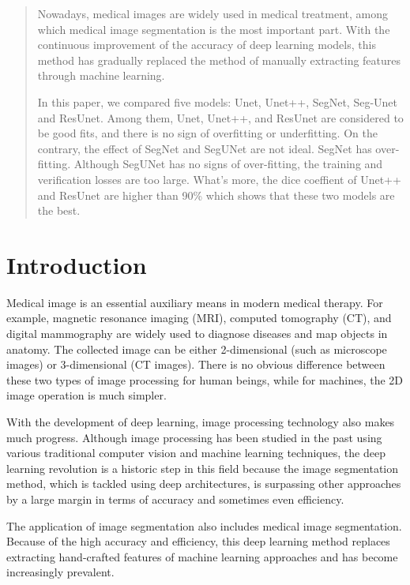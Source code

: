 \documentclass{article}
\begin{document}
\setlength{\parindent}{2em}



\begin{abstract}
    Nowadays, medical images are widely used in medical treatment, among which medical image segmentation is the most important part. With the continuous improvement of the accuracy of deep learning models, this method has gradually replaced the method of manually extracting features through machine learning.

    In this paper,  we compared five models: Unet, Unet++, SegNet, Seg-Unet and ResUnet.
    Among them, Unet, Unet++, and ResUnet are considered to be good fits, and there is no sign of overfitting or underfitting.
    On the contrary, the effect of SegNet and SegUNet are not ideal. SegNet has over-fitting. Although SegUNet has no signs of over-fitting, the training and verification losses are too large.
    What’s more, the dice coeffient of Unet++ and ResUnet are higher than 90\% which shows that these two models are the best.

\end{abstract}

\section{Introduction}

Medical image is an essential auxiliary means in modern medical therapy.
For example, magnetic resonance imaging (MRI), computed tomography (CT), and digital mammography are widely used to diagnose diseases and map objects in anatomy.\cite{pham2000current}
The collected image can be either 2-dimensional (such as microscope images) or 3-dimensional (CT images).
There is no obvious difference between these two types of image processing for human beings, while for machines, the 2D image operation is much simpler.

With the development of deep learning, image processing technology also makes much progress.
Although image processing has been studied in the past using various traditional computer vision and machine learning techniques, the deep learning revolution is a historic step in this field because the image segmentation method, which is tackled using deep architectures, is surpassing other approaches by a large margin in terms of accuracy and sometimes even efficiency.\cite{DBLP:journals/corr/Garcia-GarciaOO17}

The application of image segmentation also includes medical image segmentation.
Because of the high accuracy and efficiency, this deep learning method replaces extracting hand-crafted features of machine learning approaches and has become increasingly prevalent.\cite{hesamian2019deep}
\end{document}
